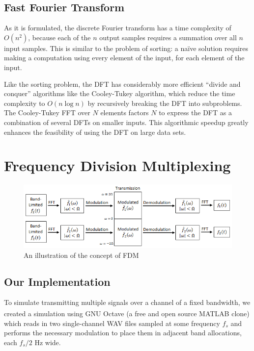 \documentclass[12pt]{article}
\begin{document}
\subsection{Fast Fourier Transform}
As it is formulated, the discrete Fourier transform has a time complexity of
\(O(n^2)\), because each of the \(n\) output samples requires a summation over
all \(n\) input samples. This is similar to the problem of sorting: a na\"{i}ve
solution requires making a computation using every element of the input, for
each element of the input.

Like the sorting problem, the DFT has considerably more efficient ``divide
and conquer'' algorithms like the Cooley-Tukey algorithm, which reduce the
time complexity to \(O(n \log{n})\) by recursively breaking the DFT into
subproblems. The Cooley-Tukey FFT over \(N\) elements factors \(N\) to express
the DFT as a combination of several DFTs on smaller inputs. This algorithmic
speedup greatly enhances the feasibility of using the DFT on large data sets.

\clearpage

\section{Frequency Division Multiplexing}

\begin{figure}[H]
\begin{centering}
\includegraphics[width=\linewidth]{FDMimage.png}
\caption{An illustration of the concept of FDM}
\end{centering}
\end{figure}


\subsection{Our Implementation}
To simulate transmitting multiple signals over a channel of a fixed bandwidth,
we created a simulation using GNU Octave (a free and open source
MATLAB\textsuperscript{\textregistered} clone) which reads in two
single-channel WAV files sampled at some frequency \(f_s\) and performs the
necessary modulation to place them in adjacent band allocations, each \(f_s/2\)
Hz wide.
\end{document}
